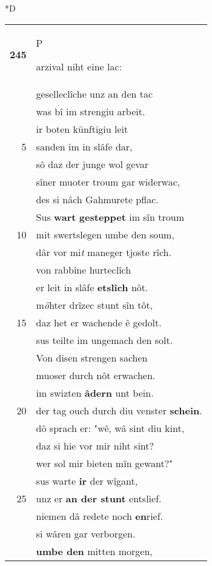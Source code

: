 \documentclass[8pt,a4paper,notitlepage]{article}
\begin{document}
\begin{table}[ht]
\begin{minipage}[t]{0.5\linewidth}
\small
\begin{center}*D
\end{center}
\begin{tabular}{rl}
\textbf{245} & \begin{large}P\end{large}arzival niht eine lac:\\ 
 & geselleclîche unz an den tac\\ 
 & was bî im strengiu arbeit.\\ 
 & ir boten künftigiu leit\\ 
5 & sanden im in slâfe dar,\\ 
 & sô daz der junge wol gevar\\ 
 & sîner muoter troum gar widerwac,\\ 
 & des si nâch Gahmurete pflac.\\ 
 & Sus \textbf{wart} \textbf{gesteppet} im sîn troum\\ 
10 & mit swertslegen umbe den soum,\\ 
 & dâr vor mi\textit{t} maneger tjoste rîch.\\ 
 & von rabbîne hurteclîch\\ 
 & er leit in slâfe \textbf{etslîch} nôt.\\ 
 & m\textit{ö}hter drîzec stunt sîn tôt,\\ 
15 & daz het er wachende ê gedolt.\\ 
 & sus teilte im ungemach den solt.\\ 
 & Von disen strengen sachen\\ 
 & muoser durch nôt erwachen.\\ 
 & im swizten \textbf{âdern} unt bein.\\ 
20 & der tag ouch durch diu venster \textbf{schein}.\\ 
 & dô sprach er: "wê, wâ sint diu kint,\\ 
 & daz si hie vor mir niht sint?\\ 
 & wer sol mir bieten mîn gewant?"\\ 
 & sus warte \textbf{ir} der wîgant,\\ 
25 & unz er \textbf{an der stunt} entslief.\\ 
 & niemen dâ redete noch \textbf{en}rief.\\ 
 & si wâren gar verborgen.\\ 
 & \textbf{umbe den} mitten morgen,\\ 

\end{tabular}
\end{minipage}
\end{table}
\end{document}
